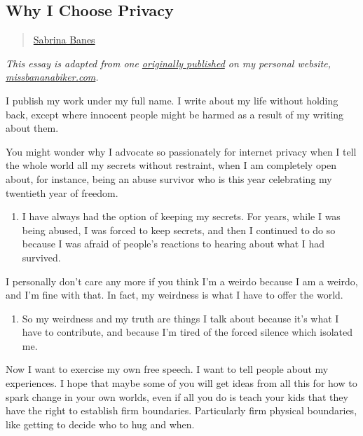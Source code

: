 \subsection{Why I Choose Privacy}\label{why-i-choose-privacy}

\begin{quote}
\hyperlink{sabrina-banes}{Sabrina Banes}
\end{quote}

\emph{This essay is adapted from one
\href{http://www.missbananabiker.com/2015/10/28/the-option-of-privacy/}{originally
published} on my personal website,
\href{http://missbananabiker.com}{missbananabiker.com}.}

I publish my work under my full name. I write about my life without
holding back, except where innocent people might be harmed as a result
of my writing about them.

You might wonder why I advocate so passionately for internet privacy
when I tell the whole world all my secrets without restraint, when I am
completely open about, for instance, being an abuse survivor who is this
year celebrating my twentieth year of freedom.

\begin{enumerate}
\def\labelenumi{\arabic{enumi}.}
\tightlist
\item
  I have always had the option of keeping my secrets. For years, while I
  was being abused, I was forced to keep secrets, and then I continued
  to do so because I was afraid of people's reactions to hearing about
  what I had survived.
\end{enumerate}

I personally don't care any more if you think I'm a weirdo because I am
a weirdo, and I'm fine with that. In fact, my weirdness is what I have
to offer the world.

\begin{enumerate}
\def\labelenumi{\arabic{enumi}.}
\setcounter{enumi}{1}
\tightlist
\item
  So my weirdness and my truth are things I talk about because it's what
  I have to contribute, and because I'm tired of the forced silence
  which isolated me.
\end{enumerate}

Now I want to exercise my own free speech. I want to tell people about
my experiences. I hope that maybe some of you will get ideas from all
this for how to spark change in your own worlds, even if all you do is
teach your kids that they have the right to establish firm boundaries.
Particularly firm physical boundaries, like getting to decide who to hug
and when.

